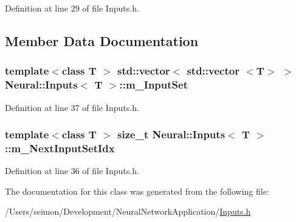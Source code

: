 Definition at line 29 of file Inputs.h.



\subsection{Member Data Documentation}
\hypertarget{class_neural_1_1_inputs_ad0283c807ff169eb9ebf3a7603ef3ccf}{
\subsubsection[{m\_\-InputSet}]{\setlength{\rightskip}{0pt plus 5cm}template$<$class T $>$ std::vector$<$ std::vector $<$T$>$ $>$ {\bf Neural::Inputs}$<$ T $>$::{\bf m\_\-InputSet}}}
\label{class_neural_1_1_inputs_ad0283c807ff169eb9ebf3a7603ef3ccf}


Definition at line 37 of file Inputs.h.

\hypertarget{class_neural_1_1_inputs_a238e762efd4eba33f84715447970ece9}{
\subsubsection[{m\_\-NextInputSetIdx}]{\setlength{\rightskip}{0pt plus 5cm}template$<$class T $>$ size\_\-t {\bf Neural::Inputs}$<$ T $>$::{\bf m\_\-NextInputSetIdx}}}
\label{class_neural_1_1_inputs_a238e762efd4eba33f84715447970ece9}


Definition at line 36 of file Inputs.h.



The documentation for this class was generated from the following file:\begin{DoxyCompactItemize}
\item 
/Users/seimon/Development/NeuralNetworkApplication/\hyperlink{_inputs_8h}{Inputs.h}\end{DoxyCompactItemize}
